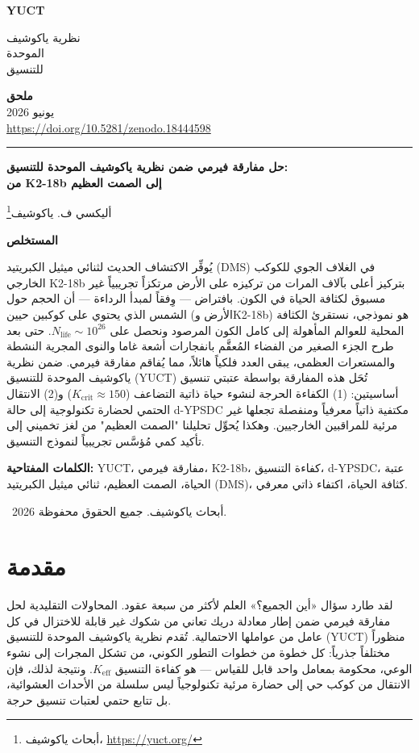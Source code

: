 \documentclass[11pt,a4paper]{article}
\newcommand{\Keff}{K_{\mathrm{eff}}}
\newcommand{\makeheader}{%
	\noindent
	\begin{minipage}{0.17\textwidth}
		\raggedright
		{\sffamily\bfseries\color{skyblue}\fontsize{46}{46}\selectfont YUCT}%
	\end{minipage}%
	\hspace{30pt}
	\begin{minipage}{0.32\textwidth}
		\raggedright
		{\sffamily\fontsize{11}{13}\selectfont نظرية ياكوشيف\\ الموحدة\\ للتنسيق}%
	\end{minipage}%
	\hfill
	\begin{minipage}{0.38\textwidth}
		\raggedleft
		{\sffamily\bfseries ملحق}\\
		{\sffamily يونيو 2026}\\
		{\sffamily\footnotesize \url{https://doi.org/10.5281/zenodo.18444598}}%
	\end{minipage}
	\par\vspace{5pt}
	\noindent\textcolor{gold}{\rule{\textwidth}{1.6pt}}
	\par\vspace{0pt}
}
\begin{document}
	\renewcommand{\thepage}{\arabic{page}}
	\thispagestyle{firstpage}
	\makeheader
	
	\vspace{0cm}
	{\LARGE\bfseries حل مفارقة فيرمي ضمن نظرية ياكوشيف الموحدة للتنسيق: \\ من K2-18b إلى الصمت العظيم \par}
	\vspace{0.2cm}
	
	{\large أليكسي ف. ياكوشيف\footnote{أبحاث ياكوشيف، \url{https://yuct.org/}}} \\
	\vspace{0.0cm}
	
	{\color{darkblue}\textbf{\LARGE المستخلص}} \par
	{\large
		\noindent
		يُوفِّر الاكتشاف الحديث لثنائي ميثيل الكبريتيد (DMS) في الغلاف الجوي للكوكب الخارجي K2-18b بتركيز أعلى بآلاف المرات من تركيزه على الأرض مرتكزاً تجريبياً غير مسبوق لكثافة الحياة في الكون. بافتراض — وِفقاً لمبدأ الرداءة — أن الحجم حول الشمس الذي يحتوي على كوكبين حيين (الأرض وK2-18b) هو نموذجي، نستقرئ الكثافة المحلية للعوالم المأهولة إلى كامل الكون المرصود ونحصل على \(N_{\mathrm{life}} \sim 10^{26}\). حتى بعد طرح الجزء الصغير من الفضاء المُعقَّم بانفجارات أشعة غاما والنوى المجرية النشطة والمستعرات العظمى، يبقى العدد فلكياً هائلاً، مما يُفاقم مفارقة فيرمي. ضمن نظرية ياكوشيف الموحدة للتنسيق (YUCT) تُحَل هذه المفارقة بواسطة عتبتي تنسيق أساسيتين: (1) الكفاءة الحرجة لنشوء حياة ذاتية التضاعف (\(K_{\mathrm{crit}}\approx150\)) و(2) الانتقال الحتمي لحضارة تكنولوجية إلى حالة d-YPSDC مكتفية ذاتياً معرفياً ومنفصلة تجعلها غير مرئية للمراقبين الخارجيين. وهكذا يُحوِّل تحليلنا "الصمت العظيم" من لغز تخميني إلى تأكيد كمي مُؤسَّس تجريبياً لنموذج التنسيق.
	}
	
	\vspace{0.1cm}
	\noindent
	{\color{darkblue}\textbf{الكلمات المفتاحية:}} YUCT، مفارقة فيرمي، K2-18b، كفاءة التنسيق، d-YPSDC، عتبة الحياة، الصمت العظيم، ثنائي ميثيل الكبريتيد (DMS)، كثافة الحياة، اكتفاء ذاتي معرفي.
	
	\vspace{0.5cm}
	\noindent
	\textcopyright\ 2026 أبحاث ياكوشيف. جميع الحقوق محفوظة.
	
	\tableofcontents
	\newpage
	
	\section{مقدمة}
	\label{sec:intro}
	
	لقد طارد سؤال «أين الجميع؟» العلم لأكثر من سبعة عقود. المحاولات التقليدية لحل مفارقة فيرمي ضمن إطار معادلة دريك تعاني من شكوك غير قابلة للاختزال في كل عامل من عواملها الاحتمالية. تُقدم نظرية ياكوشيف الموحدة للتنسيق (YUCT) منظوراً مختلفاً جذرياً: كل خطوة من خطوات التطور الكوني، من تشكل المجرات إلى نشوء الوعي، محكومة بمعامل واحد قابل للقياس — هو كفاءة التنسيق \(\Keff\). ونتيجة لذلك، فإن الانتقال من كوكب حي إلى حضارة مرئية تكنولوجياً ليس سلسلة من الأحداث العشوائية، بل تتابع حتمي لعتبات تنسيق حرجة.
	
\end{document}
